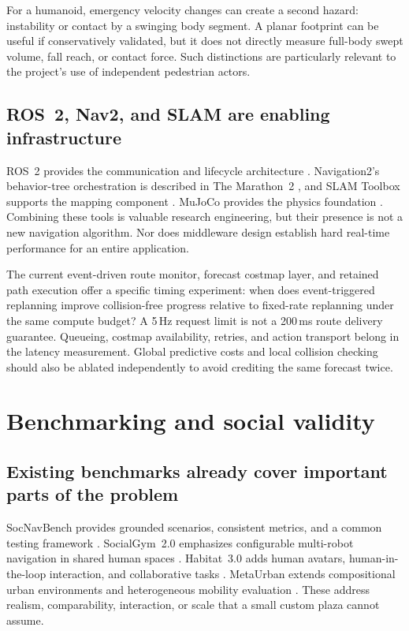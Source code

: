 \documentclass[11pt,a4paper]{article}
\begin{document}
For a humanoid, emergency velocity changes can create a second hazard:
instability or contact by a swinging body segment. A planar footprint can
be useful if conservatively validated, but it does not directly measure
full-body swept volume, fall reach, or contact force. Such distinctions are
particularly relevant to the project's use of independent pedestrian actors.

\subsection{ROS~2, Nav2, and SLAM are enabling infrastructure}
ROS~2 provides the communication and lifecycle architecture \citep{ros2}.
Navigation2's behavior-tree orchestration is described in The Marathon~2
\citep{nav2}, and SLAM Toolbox supports the mapping component \citep{slam}.
MuJoCo provides the physics foundation \citep{mujoco}. Combining these tools
is valuable research engineering, but their presence is not a new navigation
algorithm. Nor does middleware design establish hard real-time performance
for an entire application.

The current event-driven route monitor, forecast costmap layer, and retained
path execution offer a specific timing experiment: when does event-triggered
replanning improve collision-free progress relative to fixed-rate replanning
under the same compute budget? A 5\,Hz request limit is not a 200\,ms route
delivery guarantee. Queueing, costmap availability, retries, and action
transport belong in the latency measurement. Global predictive costs and
local collision checking should also be ablated independently to avoid
crediting the same forecast twice.

\section{Benchmarking and social validity}
\label{sec:benchmarks}
\subsection{Existing benchmarks already cover important parts of the problem}
SocNavBench provides grounded scenarios, consistent metrics, and a common
testing framework \citep{socnavbench}. SocialGym~2.0 emphasizes configurable
multi-robot navigation in shared human spaces \citep{socialgym}. Habitat~3.0
adds human avatars, human-in-the-loop interaction, and collaborative tasks
\citep{habitat3}. MetaUrban extends compositional urban environments and
heterogeneous mobility evaluation \citep{metaurban}. These address realism,
comparability, interaction, or scale that a small custom plaza cannot assume.
\end{document}
